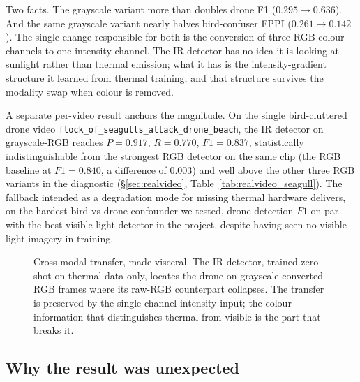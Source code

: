 \documentclass[12pt,a4paper,oneside,openright]{book}
\begin{document}
Two facts. The grayscale variant more than doubles drone F1 ($0.295 \to 0.636$). And the same grayscale variant nearly halves bird-confuser FPPI ($0.261 \to 0.142$). The single change responsible for both is the conversion of three RGB colour channels to one intensity channel. The IR detector has no idea it is looking at sunlight rather than thermal emission; what it has is the intensity-gradient structure it learned from thermal training, and that structure survives the modality swap when colour is removed.

A separate per-video result anchors the magnitude. On the single bird-cluttered drone video \texttt{flock\_of\_seagulls\_attack\_drone\_beach}, the IR detector on grayscale-RGB reaches $P=0.917$, $R=0.770$, $F1=0.837$, statistically indistinguishable from the strongest RGB detector on the same clip (the RGB baseline at $F1=0.840$, a difference of $0.003$) and well above the other three RGB variants in the diagnostic (\S\ref{sec:realvideo}, Table~\ref{tab:realvideo_seagull}). The fallback intended as a degradation mode for missing thermal hardware delivers, on the hardest bird-vs-drone confounder we tested, drone-detection $F1$ on par with the best visible-light detector in the project, despite having seen no visible-light imagery in training.

\begin{figure}[htbp]
    \centering
    \caption{Cross-modal transfer, made visceral. The IR detector, trained zero-shot on thermal data only, locates the drone on grayscale-converted RGB frames where its raw-RGB counterpart collapses. The transfer is preserved by the single-channel intensity input; the colour information that distinguishes thermal from visible is the part that breaks it.}
    \label{fig:grayscale_qualitative}
\end{figure}

\subsection{Why the result was unexpected}
\end{document}
